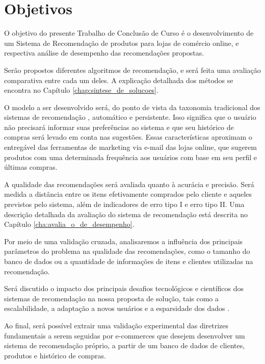 \chapter[Objetivos]{Objetivos}
\label{chap:objetivos}

O objetivo do presente Trabalho de Conclusão de Curso é o desenvolvimento de um Sistema de Recomendação de produtos para lojas de comércio online, e respectiva análise de desempenho das recomendações propostas. 

Serão propostos diferentes algoritmos de recomendação, e será feita uma avaliação comparativa entre cada um deles. A explicação detalhada dos métodos se encontra no Capítulo \ref{chap:sintese_de_solucoes}.

O modelo a ser desenvolvido será, do ponto de vista da taxonomia tradicional dos sistemas de recomendação \cite{schafer1999recommender}, automático e persistente. Isso significa que o usuário não precisará informar suas preferências ao sistema e que seu histórico de compras será levado em conta nas sugestões. Essas características aproximam o entregável das ferramentas de marketing via e-mail das lojas online, que sugerem produtos com uma determinada frequência aos usuários com base em seu perfil e últimas compras. 

A qualidade das recomendações será avaliada quanto à acurácia e precisão. Será medida a distância entre os itens efetivamente comprados pelo cliente e aqueles previstos pelo sistema, além de indicadores de erro tipo I e erro tipo II. Uma descrição detalhada da avaliação do sistema de recomendação está descrita no Capítulo \ref{cha:avalia_o_de_desempenho}.

Por meio de uma validação cruzada, analisaremos a influência dos principais parâmetros do problema na qualidade das recomendações, como o tamanho do banco de dados ou a quantidade de informações de itens e clientes utilizadas na recomendação.

Será discutido o impacto dos principais desafios tecnológicos e científicos dos sistemas de recomendação na nossa proposta de solução, tais como a escalabilidade, a adaptação a novos usuários e a esparsidade dos dados \cite{sarwar2000analysis}.

Ao final, será possível extrair uma validação experimental das diretrizes fundamentais a serem seguidas por e-commerces que desejem desenvolver um sistema de recomendação próprio, a partir de um banco de dados de clientes, produtos e histórico de compras. 